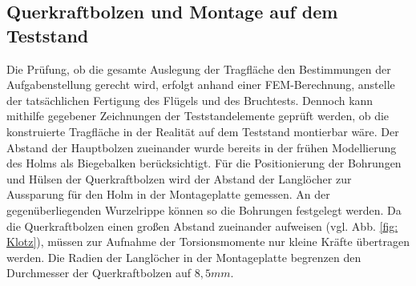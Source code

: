 \subsection{Querkraftbolzen und Montage auf dem Teststand}
Die Prüfung, ob die gesamte Auslegung der Tragfläche den Bestimmungen der Aufgabenstellung gerecht wird, erfolgt anhand einer FEM-Berechnung, anstelle der tatsächlichen Fertigung des Flügels und des Bruchtests. Dennoch kann mithilfe gegebener Zeichnungen der Teststandelemente geprüft werden, ob die konstruierte Tragfläche in der Realität auf dem Teststand montierbar wäre. Der Abstand der Hauptbolzen zueinander wurde bereits in der frühen Modellierung des Holms als Biegebalken berücksichtigt. Für die Positionierung der Bohrungen und Hülsen der Querkraftbolzen wird der Abstand der Langlöcher zur Aussparung für den Holm in der Montageplatte gemessen. An der gegenüberliegenden Wurzelrippe können so die Bohrungen festgelegt werden. Da die Querkraftbolzen einen großen Abstand zueinander aufweisen (vgl. Abb. \ref{fig: Klotz}), müssen zur Aufnahme der Torsionsmomente nur kleine Kräfte übertragen werden. Die Radien der Langlöcher in der Montageplatte begrenzen den Durchmesser der Querkraftbolzen auf $ 8,5mm $. 
